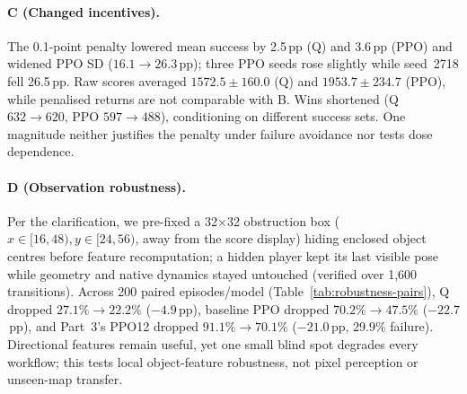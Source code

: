 \paragraph{C (Changed incentives).}
The 0.1-point penalty lowered mean success by 2.5\,pp (Q) and 3.6\,pp (PPO) and widened PPO SD
($16.1\to 26.3$\,pp); three PPO seeds rose slightly while seed~2718 fell 26.5\,pp. Raw scores
averaged $1572.5\pm 160.0$ (Q) and $1953.7\pm 234.7$ (PPO), while penalised returns are not
comparable with B. Wins shortened (Q $632\to 620$, PPO $597\to 488$), conditioning on different
success sets. One magnitude neither justifies the penalty under failure avoidance nor tests dose dependence.

\paragraph{D (Observation robustness).}
Per the clarification, we pre-fixed a 32$\times$32 obstruction box ($x\in[16,48), y\in[24,56)$,
away from the score display) hiding enclosed object centres before feature recomputation; a hidden
player kept its last visible pose while geometry and native dynamics stayed untouched (verified over
1,600 transitions). Across 200 paired episodes/model (Table~\ref{tab:robustness-pairs}), Q dropped
$27.1\%\to 22.2\%$ ($-4.9$\,pp), baseline PPO dropped $70.2\%\to 47.5\%$ ($-22.7$\,pp), and Part~3's
PPO12 dropped $91.1\%\to 70.1\%$ ($-21.0$\,pp, 29.9\% failure). Directional features remain useful,
yet one small blind spot degrades every workflow; this tests local object-feature robustness, not pixel
perception or unseen-map transfer.

